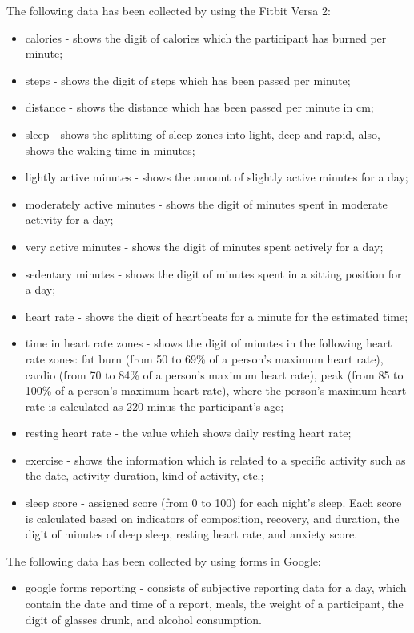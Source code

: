 The following data has been collected by using the Fitbit Versa 2:
\begin{itemize}
    \item calories - shows the digit of calories which the participant has burned per minute;
    \item steps - shows the digit of steps which has been passed per minute;
    \item distance - shows the distance which has been passed per minute in cm;
    \item sleep - shows the splitting of sleep zones into light, deep and rapid, also, shows the waking time in minutes;
    \item lightly active minutes - shows the amount of slightly active minutes for a day;
    \item moderately active minutes - shows the digit of minutes spent in moderate activity for a day;
    \item very active minutes - shows the digit of minutes spent actively for a day;
    \item sedentary minutes - shows the digit of minutes spent in a sitting position for a day;
    \item heart rate - shows the digit of heartbeats for a minute for the estimated time;
    \item time in heart rate zones - shows the digit of minutes in the following heart rate zones: fat burn (from 50 to 69\% of a person's maximum heart rate), cardio (from 70 to 84\% of a person's maximum heart rate), peak (from 85 to 100\% of a person's maximum heart rate), where the person's maximum heart rate is calculated as 220 minus the participant's age;
    \item resting heart rate - the value which shows daily resting heart rate;
    \item exercise - shows the information which is related to a specific activity such as the date, activity duration, kind of activity, etc.;
    \item sleep score - assigned score (from 0 to 100) for each night's sleep. Each score is calculated based on indicators of composition, recovery, and duration, the digit of minutes of deep sleep, resting heart rate, and anxiety score.
\end{itemize}

The following data has been collected by using forms in Google:
\begin{itemize}
    \item google forms reporting - consists of subjective reporting data for a day, which contain the date and time of a report, meals, the weight of a participant, the digit of glasses drunk, and alcohol consumption.
\end{itemize}

